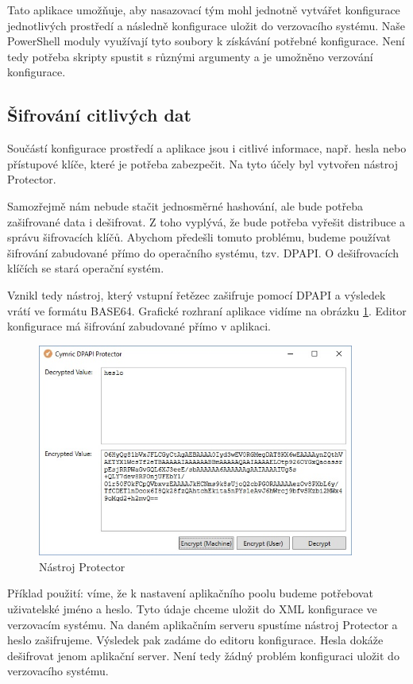 Tato aplikace umožňuje, aby nasazovací tým mohl jednotně vytvářet konfigurace jednotlivých prostředí a následně konfigurace uložit do verzovacího systému. Naše PowerShell moduly využívají tyto soubory k získávání potřebné konfigurace. Není tedy potřeba skripty spustit s různými argumenty a je umožněno verzování konfigurace.

\subsection{Šifrování citlivých dat}
Součástí konfigurace prostředí a aplikace jsou i citlivé informace, např. hesla nebo přístupové klíče, které je potřeba zabezpečit. Na tyto účely  byl vytvořen nástroj Protector.

Samozřejmě nám nebude stačit jednosměrné hashování, ale bude potřeba zašifrované data i dešifrovat. Z toho vyplývá, že bude potřeba vyřešit distribuce a správu šifrovacích klíčů. Abychom předešli tomuto problému, budeme používat šifrování zabudované přímo do operačního systému, tzv. DPAPI. O dešifrovacích klíčích se stará operační systém. 

Vznikl tedy nástroj, který vstupní řetězec zašifruje pomocí DPAPI a výsledek vrátí ve formátu BASE64. Grafické rozhraní aplikace vidíme na obrázku \ref{fig:protector}. Editor konfigurace má šifrování zabudované přímo v aplikaci. 

\begin{figure}[]
  \centering
  \includegraphics[height=7cm]{fig/protector.jpg}
  \caption{Nástroj Protector}
  \label{fig:protector}
\end{figure}

Příklad použití: víme, že k nastavení aplikačního poolu budeme potřebovat uživatelské jméno a heslo. Tyto údaje chceme uložit do XML konfigurace ve verzovacím systému. Na daném aplikačním serveru spustíme nástroj Protector a heslo zašifrujeme. Výsledek pak zadáme do editoru konfigurace. Hesla dokáže dešifrovat jenom aplikační server. Není tedy žádný problém konfiguraci uložit do verzovacího systému.

